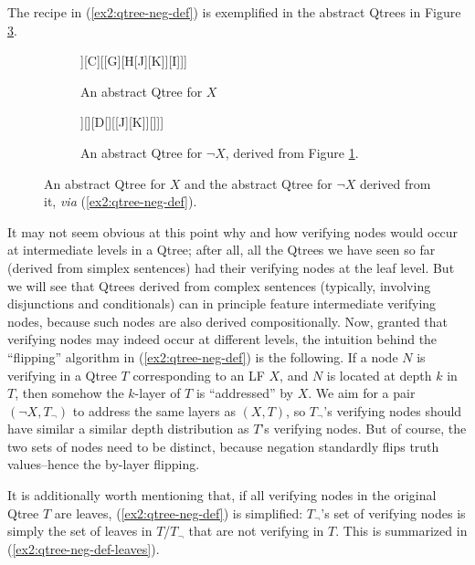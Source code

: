 The recipe in (\ref{ex2:qtree-neg-def}) is exemplified in the abstract Qtrees in Figure \ref{fig:qtree-x-neg-x}. 

\begin{figure}[H]
	\centering
	\begin{subfigure}[t]{.45\linewidth}
		\centering
		\begin{forest}
			[A[\fbox{B}[\fbox{E}][\fbox{F}]][C][[G][H[J][K]][I]]]
		\end{forest}
		\caption{An abstract Qtree for $X$}\label{fig:qtree-x}
	\end{subfigure}
	\hfill
	\begin{subfigure}[t]{.45\linewidth}
		\centering
		\begin{forest}
			[A[{B}[{E}][{F}]][][{D}[][[J][K]][]]]
		\end{forest}
		\caption{An abstract Qtree for $\neg X$, derived from Figure \ref{fig:qtree-x}.}\label{fig:qtree-neg-x}
	\end{subfigure}
	\caption{An abstract Qtree for $X$ and the abstract Qtree for $\neg X$ derived from it, \textit{via} (\ref{ex2:qtree-neg-def}).}\label{fig:qtree-x-neg-x}
\end{figure}


It may not seem obvious at this point why and how verifying nodes would occur at intermediate levels in a Qtree; after all, all the Qtrees we have seen so far (derived from simplex sentences) had their verifying nodes at the leaf level. But we will see that Qtrees derived from complex sentences (typically, involving disjunctions and conditionals) can in principle feature intermediate verifying nodes, because such nodes are also derived compositionally.
Now, granted that verifying nodes may indeed occur at different levels, the intuition behind the ``flipping'' algorithm in (\ref{ex2:qtree-neg-def}) is the following. If a node $N$ is verifying in a Qtree $T$ corresponding to an LF $X$, and $N$ is located at depth $k$ in $T$, then somehow the $k$-layer of $T$ is ``addressed'' by $X$. We aim for a pair $(\neg X, T_\neg)$ to address the same layers as $(X, T)$, so $T_\neg$'s verifying nodes should have similar a similar depth distribution as $T$'s verifying nodes. But of course, the two sets of nodes need to be distinct, because negation standardly flips truth values--hence the by-layer flipping.

It is additionally worth mentioning that, if all verifying nodes in the original Qtree $T$ are leaves, (\ref{ex2:qtree-neg-def}) is simplified: $T_\neg$'s set of verifying nodes is simply the set of leaves in $T$/$T_\neg$ that are not verifying in $T$. This is summarized in (\ref{ex2:qtree-neg-def-leaves}).

